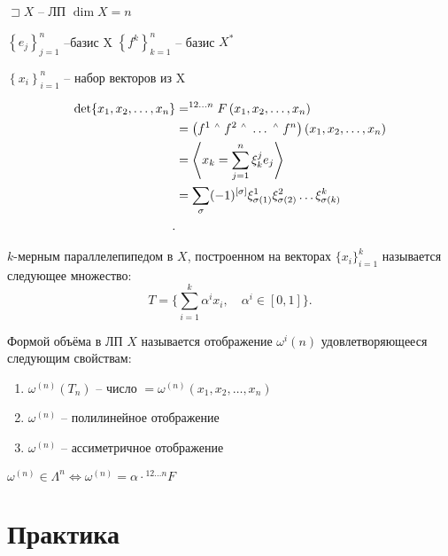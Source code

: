 \documentclass{book}
\let\latexwedge\wedge
\def\wedge{\,\raisebox{0.5ex}{\ensuremath{\scriptscriptstyle\latexwedge}\,}}
\theoremstyle{definition}
\begin{document}
$\sqsupset X$ -- ЛП $\dim X = n$

$\left\{ e_j \right\} _{j=1}^n$ --базис X \quad $\left\{ f^k \right\} _{k=1}^n$ -- базис $X^*$

$\left\{ x_i \right\} _{i=1}^n$ -- набор векторов из X

\begin{definition}
    \begin{align*}
        \det\{x_1, x_2, \ldots, x_n\} &= ^{12\ldots n}F\left( x_1, x_2, \ldots, x_n \right)  \\
                                      &= \left( f^1\wedge f^2\wedge \ldots \wedge f^n \right) \left( x_1, x_2, \ldots, x_n \right)  \\
                                      &= \left< x_k = \sum_{j=1}^{n} \xi_k^je_j\right> \\
                                      &= \sum_{\sigma}(-1)^{\left[ \sigma \right] }\xi^1_{\sigma(1)}\xi^2_{\sigma(2)} \ldots \xi^k_{\sigma(k)} \\
    .\end{align*}
\end{definition}

\begin{definition}
    $k$-мерным параллелепипедом в $X$, построенном на векторах $\{x_i\}_{i=1}^k$ называется следующее множество:
    \[
        T = \{\sum_{i=1}^{k} \alpha^ix_i, \quad \alpha^i\in [0,1]\}
    .\] 
\end{definition}

\begin{definition}
    Формой объёма в ЛП $X$ называется отображение  $\omega^i{(n)}$ удовлетворяющееся следующим свойствам:
    \begin{enumerate}
        \item $\omega^{(n)}(T_n)$ -- число  $ = \omega^{(n)}\left( x_1, x_2, \ldots, x_n \right) $ 
        \item $\omega^{(n)}$ -- полилинейное отображение
        \item  $\omega^{(n)}$ -- ассиметричное отображение
    \end{enumerate}
    
\end{definition}

\begin{lemma}
    $\omega^{(n)}\in\Lambda^n \iff \omega^{(n)} = \alpha\cdot {}^{12\ldots n}F$
\end{lemma}

\section{Практика}
\end{document}
